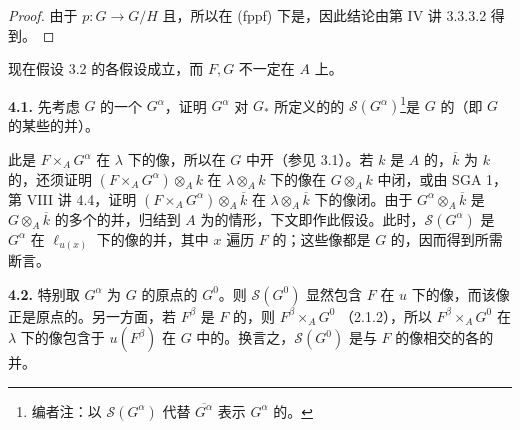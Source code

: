 \begin{proof}
由于 $p:G\to G/H$ 且，所以在 (fppf) 下是，因此结论由第 IV 讲 3.3.3.2 得到。
\end{proof}

现在假设 3.2 的各假设成立，而 $F,G$ 不一定在 $A$ 上。

\textbf{4.1.} 先考虑 $G$ 的一个 $G^\alpha$，证明 $G^\alpha$ 对 $G_*$ 所定义的的 $\mathscr S(G^\alpha)$\footnote{编者注：以 $\mathscr S(G^\alpha)$ 代替 $\overline{G^\alpha}$ 表示 $G^\alpha$ 的。}是 $G$ 的（即 $G$ 的某些的并）。

此是 $F\times_A G^\alpha$ 在 $\lambda$ 下的像，所以在 $G$ 中开（参见 3.1）。若 $k$ 是 $A$ 的，$\overline k$ 为 $k$ 的，还须证明 $(F\times_A G^\alpha)\otimes_A k$ 在 $\lambda\otimes_A k$ 下的像在 $G\otimes_A k$ 中闭，或由 SGA 1，第 VIII 讲 4.4，证明 $(F\times_A G^\alpha)\otimes_A\overline k$ 在 $\lambda\otimes_A\overline k$ 下的像闭。由于 $G^\alpha\otimes_A\overline k$ 是 $G\otimes_A\overline k$ 的多个的并，归结到 $A$ 为的情形，下文即作此假设。此时，$\mathscr S(G^\alpha)$ 是 $G^\alpha$ 在 $\ell_{u(x)}$ 下的像的并，其中
$x$ 遍历 $F$ 的；这些像都是 $G$ 的，因而得到所需断言。

\textbf{4.2.} 特别取 $G^\alpha$ 为 $G$ 的原点的 $G^0$。则 $\mathscr S(G^0)$ 显然包含 $F$ 在 $u$ 下的像，而该像正是原点的。另一方面，若 $F^\beta$ 是 $F$ 的，则 $F^\beta\times_A G^0$ （2.1.2），所以 $F^\beta\times_A G^0$ 在 $\lambda$ 下的像包含于 $u(F^\beta)$ 在 $G$ 中的。换言之，$\mathscr S(G^0)$ 是与 $F$ 的像相交的各的并。

